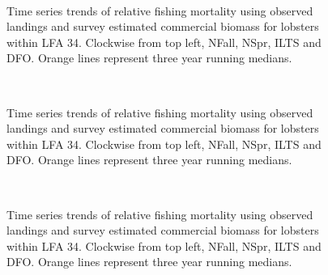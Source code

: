 \documentclass[11pt]{article}
\newcommand{\e}{/SpinDr/backup/bio_data/bio.lobster/figures/LFA34Assessment/}
\begin{document}
\begin{figure}
        \centering
    \\
        
         \caption{Time series trends of relative fishing mortality using observed landings and survey estimated commercial biomass for lobsters within LFA 34. Clockwise from top left, NFall, NSpr, ILTS and DFO. Orange lines represent three year running medians.}
        \end{figure}


\begin{figure}
        \centering
    \\
        
         \caption{Time series trends of relative fishing mortality using observed landings and survey estimated commercial biomass for lobsters within LFA 34. Clockwise from top left, NFall, NSpr, ILTS and DFO. Orange lines represent three year running medians.}
        \end{figure}



\begin{figure}
        \centering
    \\
        
         \caption{Time series trends of relative fishing mortality using observed landings and survey estimated commercial biomass for lobsters within LFA 34. Clockwise from top left, NFall, NSpr, ILTS and DFO. Orange lines represent three year running medians.}
        \end{figure}
\end{document}
